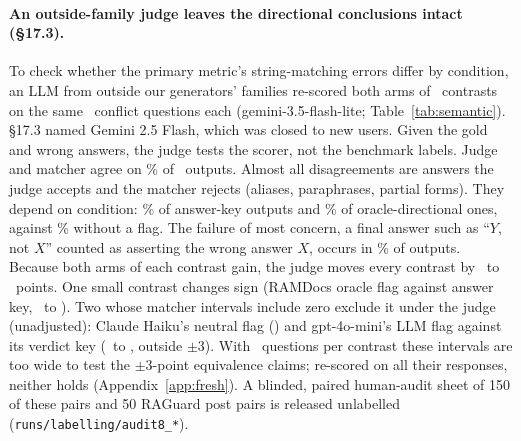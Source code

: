 \paragraph{An outside-family judge leaves the directional conclusions intact (\S17.3).} To
check whether the primary metric's string-matching errors differ by condition, an LLM from outside our generators' families re-scored both
arms of \semK\ contrasts on the same \semNq\ conflict questions each (gemini-3.5-flash-lite; Table~\ref{tab:semantic}).
\S17.3 named Gemini 2.5 Flash, which was closed to new users. Given the gold and wrong answers, the judge tests the
scorer, not the benchmark labels. Judge and matcher agree on \semAgree\% of \semN\ outputs. Almost all
disagreements are answers the judge accepts and the matcher rejects (aliases, paraphrases, partial forms).
They depend on condition: \semJudgeOnlyKey\% of answer-key outputs and \semJudgeOnlyDir\% of oracle-directional ones,
against \semJudgeOnlyPlain\% without a flag. The failure of most concern, a final answer such as
``$Y$, not $X$'' counted as asserting the wrong answer $X$, occurs in \semRejected\% of outputs. Because
both arms of each contrast gain, the judge moves every contrast by \semDidMin\ to \semDidMax\ points. One small contrast changes sign (RAMDocs oracle flag against answer key, \semTwentyThreeRDMiniM\ to \semTwentyThreeRDMiniJ).
Two whose matcher intervals include zero exclude it under the judge (unadjusted): Claude Haiku's neutral flag
(\semNeuCBsHaikuJ) and gpt-4o-mini's LLM flag against its verdict key (\semThirtyCBsMiniM\ to \semThirtyCBsMiniJ, outside $\pm$3). With \semNq\ questions per contrast these
intervals are too wide to test the $\pm$3-point equivalence claims; re-scored on all their responses, neither holds
(Appendix~\ref{app:fresh}). A blinded, paired human-audit sheet of
150 of these pairs and 50 RAGuard post pairs is released unlabelled (\texttt{runs/labelling/audit8\_*}).


